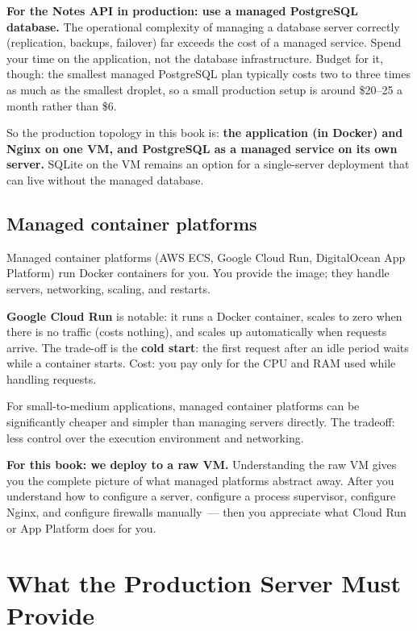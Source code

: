 \noindent{}\textbf{For the Notes API in production: use a managed PostgreSQL database.} The operational complexity of managing a database server correctly (replication, backups, failover) far exceeds the cost of a managed service. Spend your time on the application, not the database infrastructure. Budget for it, though: the smallest managed PostgreSQL plan typically costs two to three times as much as the smallest droplet, so a small production setup is around \$20--25 a month rather than \$6.

So the production topology in this book is: \textbf{the application (in Docker) and Nginx on one VM, and PostgreSQL as a managed service on its own server.} SQLite on the VM remains an option for a single-server deployment that can live without the managed database.

\subsection*{Managed container platforms}\label{20-server-fundamentals:managed-container-platforms}

Managed container platforms (AWS ECS, Google Cloud Run, DigitalOcean App Platform) run Docker containers for you. You provide the image; they handle servers, networking, scaling, and restarts.

\textbf{Google Cloud Run} is notable: it runs a Docker container, scales to zero when there is no traffic (costs nothing), and scales up automatically when requests arrive. The trade-off is the \textbf{cold start}: the first request after an idle period waits while a container starts. Cost: you pay only for the CPU and RAM used while handling requests.

For small-to-medium applications, managed container platforms can be significantly cheaper and simpler than managing servers directly. The tradeoff: less control over the execution environment and networking.

\textbf{For this book: we deploy to a raw VM.} Understanding the raw VM gives you the complete picture of what managed platforms abstract away. After you understand how to configure a server, configure a process supervisor, configure Nginx, and configure firewalls manually~--- then you appreciate what Cloud Run or App Platform does for you.

\setcounter{section}{7}
\section{What the Production Server Must Provide}\label{20-server-fundamentals:208-what-the-production-server-must-provide}

